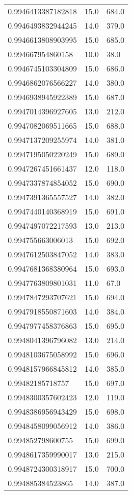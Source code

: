 \begin{center}
\begin{supertabular}[H]{p{0.30\textwidth}p{0.05\textwidth}p{0.05\textwidth}}
0.9946413387182818 & 15.0 & 684.0 \\ 
0.9946493832944245 & 14.0 & 379.0 \\ 
0.9946613808903995 & 15.0 & 685.0 \\ 
0.994667954860158 & 10.0 & 38.0 \\ 
0.9946745103304809 & 15.0 & 686.0 \\ 
0.9946862076566227 & 14.0 & 380.0 \\ 
0.9946938945922389 & 15.0 & 687.0 \\ 
0.9947014396927605 & 13.0 & 212.0 \\ 
0.9947082069511665 & 15.0 & 688.0 \\ 
0.9947137209255974 & 14.0 & 381.0 \\ 
0.9947195050220249 & 15.0 & 689.0 \\ 
0.9947267451661437 & 12.0 & 118.0 \\ 
0.9947337874854052 & 15.0 & 690.0 \\ 
0.9947391365557527 & 14.0 & 382.0 \\ 
0.9947440140368919 & 15.0 & 691.0 \\ 
0.9947497072217593 & 13.0 & 213.0 \\ 
0.994755663006013 & 15.0 & 692.0 \\ 
0.9947612503847052 & 14.0 & 383.0 \\ 
0.9947681368380964 & 15.0 & 693.0 \\ 
0.9947763809801031 & 11.0 & 67.0 \\ 
0.9947847293707621 & 15.0 & 694.0 \\ 
0.9947918550871603 & 14.0 & 384.0 \\ 
0.9947977458376863 & 15.0 & 695.0 \\ 
0.9948041396796082 & 13.0 & 214.0 \\ 
0.9948103675058992 & 15.0 & 696.0 \\ 
0.9948157966845812 & 14.0 & 385.0 \\ 
0.99482185718757 & 15.0 & 697.0 \\ 
0.9948300357602423 & 12.0 & 119.0 \\ 
0.9948386956943429 & 15.0 & 698.0 \\ 
0.9948458099056912 & 14.0 & 386.0 \\ 
0.994852798600755 & 15.0 & 699.0 \\ 
0.9948617359990017 & 13.0 & 215.0 \\ 
0.9948724300318917 & 15.0 & 700.0 \\ 
0.994885384523865 & 14.0 & 387.0 \\ 

\end{supertabular}
\end{center}
